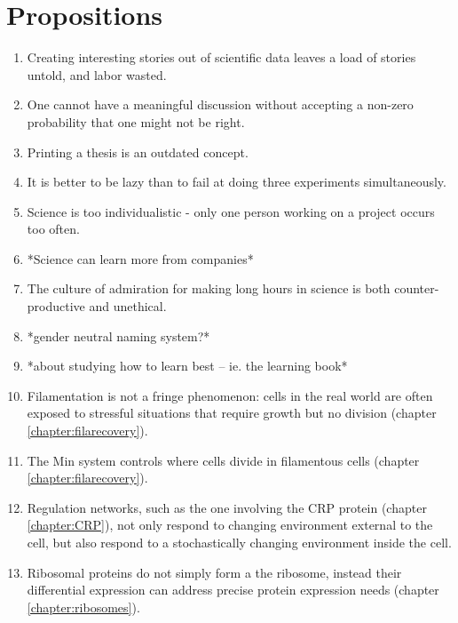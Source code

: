 

\chapter*{Propositions}

\begin{enumerate}
    \item Creating interesting stories out of scientific data leaves a load of stories untold, and labor wasted.    
    \item One cannot have a meaningful discussion without accepting a non-zero probability that one might not be right.
    \item Printing a thesis is an outdated concept.
    \item It is better to be lazy than to fail at doing three experiments simultaneously.
    \item Science is too individualistic - only one person working on a project occurs too often.
    \item *Science can learn more from companies*
    \item The culture of admiration for making long hours in science is both counter-productive and unethical.
    \item *gender neutral naming system?*
    \item *about studying how to learn best -- ie. the learning book*
    \item Filamentation is not a fringe phenomenon: cells in the real world are often exposed to stressful situations that require growth but no division (chapter \ref{chapter:filarecovery}).
    \item The Min system controls where cells divide in filamentous cells (chapter \ref{chapter:filarecovery}).
    \item Regulation networks, such as the one involving the CRP protein (chapter \ref{chapter:CRP}), not only respond to changing environment external to the cell, but also respond to a stochastically changing environment inside the cell.
    \item Ribosomal proteins do not simply form a the ribosome, instead their differential expression can address precise protein expression needs (chapter \ref{chapter:ribosomes}).
\end{enumerate}


